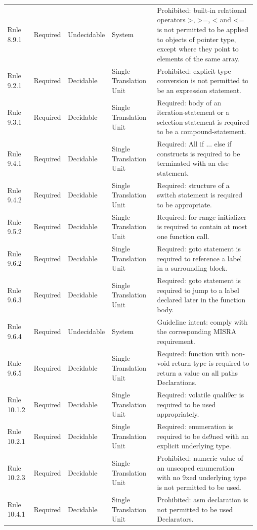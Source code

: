 \documentclass[11pt]{article}
\begin{document}
{\begin{longtable}{@{}P{2.2cm}P{1.7cm}P{2.1cm}P{3.0cm}P{6.7cm}@{}}
Rule 8.9.1 & Required & Undecidable & System & Prohibited: built-in relational operators >, >=, < and <= is not permitted to be applied to objects of pointer type, except where they point to elements of the same array. \\
Rule 9.2.1 & Required & Decidable & Single Translation Unit & Prohibited: explicit type conversion is not permitted to be an expression statement. \\
Rule 9.3.1 & Required & Decidable & Single Translation Unit & Required: body of an iteration-statement or a selection-statement is required to be a compound-statement. \\
Rule 9.4.1 & Required & Decidable & Single Translation Unit & Required: All if ... else if constructs is required to be terminated with an else statement. \\
Rule 9.4.2 & Required & Decidable & Single Translation Unit & Required: structure of a switch statement is required to be appropriate. \\
Rule 9.5.2 & Required & Decidable & Single Translation Unit & Required: for-range-initializer is required to contain at most one function call. \\
Rule 9.6.2 & Required & Decidable & Single Translation Unit & Required: goto statement is required to reference a label in a surrounding block. \\
Rule 9.6.3 & Required & Decidable & Single Translation Unit & Required: goto statement is required to jump to a label declared later in the function body. \\
Rule 9.6.4 & Required & Undecidable & System & Guideline intent: comply with the corresponding MISRA requirement. \\
Rule 9.6.5 & Required & Decidable & Single Translation Unit & Required: function with non-void return type is required to return a value on all paths Declarations. \\
Rule 10.1.2 & Required & Decidable & Single Translation Unit & Required: volatile quali9er is required to be used appropriately. \\
Rule 10.2.1 & Required & Decidable & Single Translation Unit & Required: enumeration is required to be de9ned with an explicit underlying type. \\
Rule 10.2.3 & Required & Decidable & Single Translation Unit & Prohibited: numeric value of an unscoped enumeration with no 9xed underlying type is not permitted to be used. \\
Rule 10.4.1 & Required & Decidable & Single Translation Unit & Prohibited: asm declaration is not permitted to be used Declarators. \\

\end{longtable}}
\end{document}

